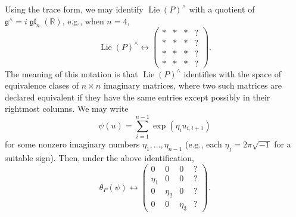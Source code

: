 \documentclass[reqno]{amsart}
\DeclareMathOperator{\glLie}{\mathfrak{g}\mathfrak{l}}
\DeclareMathOperator{\Lie}{Lie}
\theoremstyle{plain} \newtheorem{theorem} {Theorem}
\theoremstyle{definition} \newtheorem{definition} [theorem] {Definition}
\theoremstyle{itplain} %
\numberwithin{equation}{section}
\numberwithin{theorem}{section}
\begin{document}
Using the trace form, we may identify $\Lie(P)^\wedge$ with a quotient of $\mathfrak{g}^\wedge = i \glLie_n(\mathbb{R})$, e.g., when $n=4$,
\begin{equation*}
  \Lie(P)^\wedge \leftrightarrow
  \begin{pmatrix}
    \ast & \ast & \ast & ? \\
    \ast & \ast & \ast & ? \\
    \ast & \ast & \ast & ? \\
    \ast & \ast & \ast & ?
  \end{pmatrix}.
\end{equation*}
The meaning of this notation is that $\Lie(P)^\wedge$ identifies with the space of equivalence clases of $n \times n$ imaginary matrices, where two such matrices are declared equivalent if they have the same entries except possibly in their rightmost columns.  We may write
\begin{equation}\label{eq:psiu-=-sum_i=1n}
  \psi(u) = \sum_{i=1}^{n-1} \exp(\eta_i u_{i,i+1})
\end{equation}
for some nonzero imaginary numbers $\eta_1,\dotsc,\eta_{n-1}$ (e.g., each $\eta_j = 2 \pi \sqrt{-1}$ for a suitable sign).  Then, under the above identification,
\begin{equation}\label{eq:theta-leftr-beginpm}
  \theta_P(\psi)
  \leftrightarrow 
  \begin{pmatrix}
    0 & 0 & 0 & ? \\
    \eta_1  & 0 & 0 & ? \\
    0 & \eta_2  & 0 & ? \\
    0 & 0 & \eta_3  & ?
  \end{pmatrix}.
\end{equation}
\end{document}
